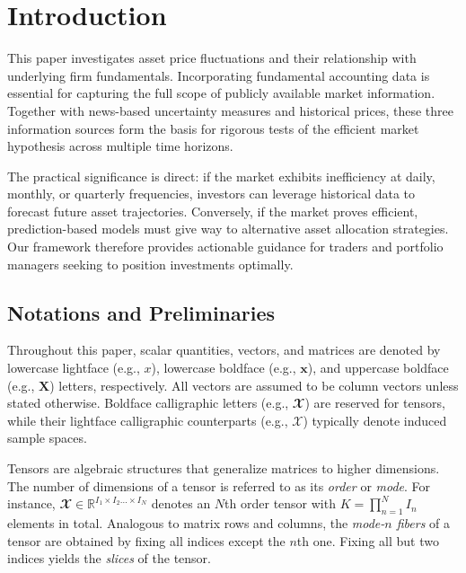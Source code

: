 \documentclass[pdflatex,sn-mathphys-num]{sn-jnl}%
\theoremstyle{thmstyleone}%
\theoremstyle{thmstyletwo}%
\theoremstyle{thmstylethree}%
\begin{document}


\section{Introduction}

This paper investigates asset price fluctuations and their relationship with underlying firm fundamentals. Incorporating fundamental accounting data is essential for capturing the full scope of publicly available market information. Together with news-based uncertainty measures and historical prices, these three information sources form the basis for rigorous tests of the efficient market hypothesis across multiple time horizons.

The practical significance is direct: if the market exhibits inefficiency at daily, monthly, or quarterly frequencies, investors can leverage historical data to forecast future asset trajectories. Conversely, if the market proves efficient, prediction-based models must give way to alternative asset allocation strategies. Our framework therefore provides actionable guidance for traders and portfolio managers seeking to position investments optimally.

\subsection{Notations and Preliminaries}
\label{Intro:4}
Throughout this paper, scalar quantities, vectors, and matrices are denoted by lowercase lightface (e.g., $x$), lowercase boldface (e.g., $\mathbf{x}$), and uppercase boldface (e.g., $\mathbf{X}$) letters, respectively. All vectors are assumed to be column vectors unless stated otherwise. Boldface calligraphic letters (e.g., $\mathbfcal{X}$) are reserved for tensors, while their lightface calligraphic counterparts (e.g., $\mathcal{X}$) typically denote induced sample spaces.

Tensors are algebraic structures that generalize matrices to higher dimensions. The number of dimensions of a tensor is referred to as its \textit{order} or \textit{mode}. For instance, $\mathbfcal{X} \in \mathbb{R}^{I_1 \times I_2 \dots \times I_N}$ denotes an $N$th order tensor with $K = \prod_{n=1}^{N} I_n$ elements in total. Analogous to matrix rows and columns, the \textit{mode-$n$ fibers} of a tensor are obtained by fixing all indices except the $n$th one. Fixing all but two indices yields the \textit{slices} of the tensor.
\end{document}
